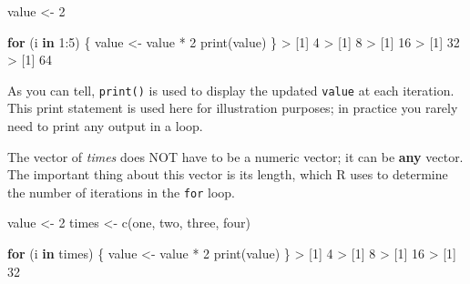 \documentclass[
]{book}
\newenvironment{Shaded}{\begin{snugshade}}{\end{snugshade}}
\newcommand{\ControlFlowTok}[1]{\textcolor[rgb]{0.13,0.29,0.53}{\textbf{#1}}}
\newcommand{\DecValTok}[1]{\textcolor[rgb]{0.00,0.00,0.81}{#1}}
\newcommand{\FunctionTok}[1]{\textcolor[rgb]{0.00,0.00,0.00}{#1}}
\newcommand{\NormalTok}[1]{#1}
\newcommand{\OtherTok}[1]{\textcolor[rgb]{0.56,0.35,0.01}{#1}}
\newcommand{\SpecialCharTok}[1]{\textcolor[rgb]{0.00,0.00,0.00}{#1}}
\newcommand{\StringTok}[1]{\textcolor[rgb]{0.31,0.60,0.02}{#1}}
\begin{document}
\begin{Shaded}
\begin{Highlighting}[]
\NormalTok{value }\OtherTok{\textless{}{-}} \DecValTok{2}

\ControlFlowTok{for}\NormalTok{ (i }\ControlFlowTok{in} \DecValTok{1}\SpecialCharTok{:}\DecValTok{5}\NormalTok{) \{ }
\NormalTok{  value }\OtherTok{\textless{}{-}}\NormalTok{ value }\SpecialCharTok{*} \DecValTok{2} 
  \FunctionTok{print}\NormalTok{(value)}
\NormalTok{\}}
\SpecialCharTok{\textgreater{}}\NormalTok{ [}\DecValTok{1}\NormalTok{] }\DecValTok{4}
\SpecialCharTok{\textgreater{}}\NormalTok{ [}\DecValTok{1}\NormalTok{] }\DecValTok{8}
\SpecialCharTok{\textgreater{}}\NormalTok{ [}\DecValTok{1}\NormalTok{] }\DecValTok{16}
\SpecialCharTok{\textgreater{}}\NormalTok{ [}\DecValTok{1}\NormalTok{] }\DecValTok{32}
\SpecialCharTok{\textgreater{}}\NormalTok{ [}\DecValTok{1}\NormalTok{] }\DecValTok{64}
\end{Highlighting}
\end{Shaded}

As you can tell, \texttt{print()} is used to display the updated \texttt{value} at each
iteration. This print statement is used here for illustration purposes; in
practice you rarely need to print any output in a loop.

The vector of \emph{times} does NOT have to be a numeric vector; it can be \textbf{any}
vector. The important thing about this vector is its length, which R uses to
determine the number of iterations in the \texttt{for} loop.

\begin{Shaded}
\begin{Highlighting}[]
\NormalTok{value }\OtherTok{\textless{}{-}} \DecValTok{2}
\NormalTok{times }\OtherTok{\textless{}{-}} \FunctionTok{c}\NormalTok{(}\StringTok{\textquotesingle{}one\textquotesingle{}}\NormalTok{, }\StringTok{\textquotesingle{}two\textquotesingle{}}\NormalTok{, }\StringTok{\textquotesingle{}three\textquotesingle{}}\NormalTok{, }\StringTok{\textquotesingle{}four\textquotesingle{}}\NormalTok{)}

\ControlFlowTok{for}\NormalTok{ (i }\ControlFlowTok{in}\NormalTok{ times) \{ }
\NormalTok{  value }\OtherTok{\textless{}{-}}\NormalTok{ value }\SpecialCharTok{*} \DecValTok{2} 
  \FunctionTok{print}\NormalTok{(value)}
\NormalTok{\}}
\SpecialCharTok{\textgreater{}}\NormalTok{ [}\DecValTok{1}\NormalTok{] }\DecValTok{4}
\SpecialCharTok{\textgreater{}}\NormalTok{ [}\DecValTok{1}\NormalTok{] }\DecValTok{8}
\SpecialCharTok{\textgreater{}}\NormalTok{ [}\DecValTok{1}\NormalTok{] }\DecValTok{16}
\SpecialCharTok{\textgreater{}}\NormalTok{ [}\DecValTok{1}\NormalTok{] }\DecValTok{32}
\end{Highlighting}
\end{Shaded}
\end{document}
